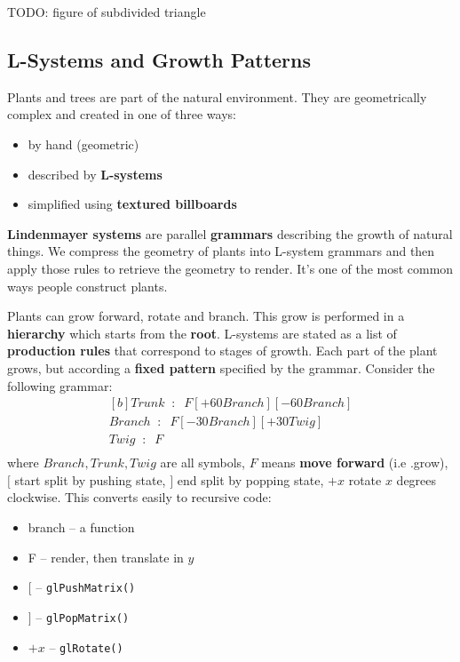 \documentclass{article}
\begin{document}
TODO: figure of subdivided triangle

\subsection{L-Systems and Growth Patterns}

Plants and trees are part of the natural environment. They are geometrically complex and created in one of three ways:
\begin{itemize}
	\item by hand (geometric)
	\item described by \textbf{L-systems}
	\item simplified using \textbf{textured billboards}
\end{itemize}

\textbf{Lindenmayer systems} are parallel \textbf{grammars} describing the growth of natural things. We compress the geometry of plants into L-system grammars and then apply those rules to retrieve the geometry to render. It's one of the most common ways people construct plants.

Plants can grow forward, rotate and branch. This grow is performed in a \textbf{hierarchy} which starts from the \textbf{root}. L-systems are stated as a list of \textbf{production rules} that correspond to stages of growth. Each part of the plant grows, but according a \textbf{fixed pattern} specified by the grammar. Consider the following grammar:
\begin{equation}
\begin{aligned}[b]
	Trunk \;\; : \;\; F[+60Branch][-60Branch] \\
	Branch \;\; : \;\; F[-30Branch][+30Twig] \\
	Twig \;\; : \;\; F \\
\end{aligned}
\label{eq:l-system-grammar}
\end{equation}
where $Branch,Trunk,Twig$ are all symbols, $F$ means \textbf{move forward} (i.e .grow), $[$ start split by pushing state, $]$ end split by popping state, $+x$ rotate $x$ degrees clockwise. This converts easily to recursive code:
\begin{itemize}
	\item branch -- a function
	\item F -- render, then translate in $y$
	\item $[$ -- \texttt{glPushMatrix()}
	\item $]$ -- \texttt{glPopMatrix()}
	\item $+x$ -- \texttt{glRotate()}
\end{itemize}
\end{document}
